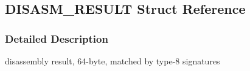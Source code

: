 \hypertarget{struct_d_i_s_a_s_m___r_e_s_u_l_t}{\subsection{D\-I\-S\-A\-S\-M\-\_\-\-R\-E\-S\-U\-L\-T Struct Reference}
\label{struct_d_i_s_a_s_m___r_e_s_u_l_t}
}


\subsubsection{Detailed Description}
disassembly result, 64-\/byte, matched by type-\/8 signatures 